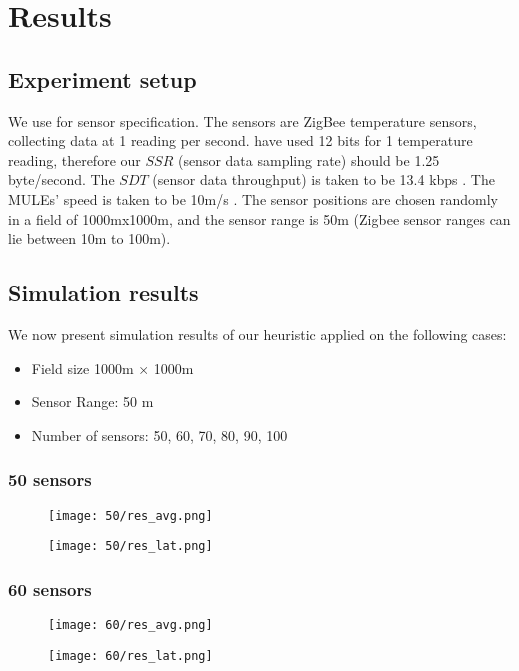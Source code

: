 \chapter{Results}

\section{Experiment setup}

We use \cite{terada} for sensor specification. The sensors are ZigBee temperature sensors, collecting data at 1 reading per second. \cite{terada} have used 12 bits for 1 temperature reading, therefore our $SSR$ (sensor data sampling rate) should be 1.25 byte/second. The $SDT$ (sensor data throughput) is taken to be 13.4 kbps \cite{zigbee}. The MULEs' speed is taken to be 10m/s \cite{muleSpeed}. The sensor positions are chosen randomly in a field of 1000mx1000m, and the sensor range is 50m (Zigbee sensor ranges can lie between 10m to 100m).

\section{Simulation results}
We now present simulation results of our heuristic applied on the following cases:
\begin{itemize}
\item Field size 1000m $\times$ 1000m
\item Sensor Range: 50 m
\item Number of sensors: 50, 60, 70, 80, 90, 100
\end{itemize}

\pagebreak

\subsection{50 sensors}
\begin{figure}[H]
\texttt{[image: 50/res\_avg.png]}
\end{figure}
\begin{figure}[H]
\texttt{[image: 50/res\_lat.png]}
\end{figure}
\subsection{60 sensors}
\begin{figure}[H]
\texttt{[image: 60/res\_avg.png]}
\end{figure}
\begin{figure}[H]
\texttt{[image: 60/res\_lat.png]}
\end{figure}

